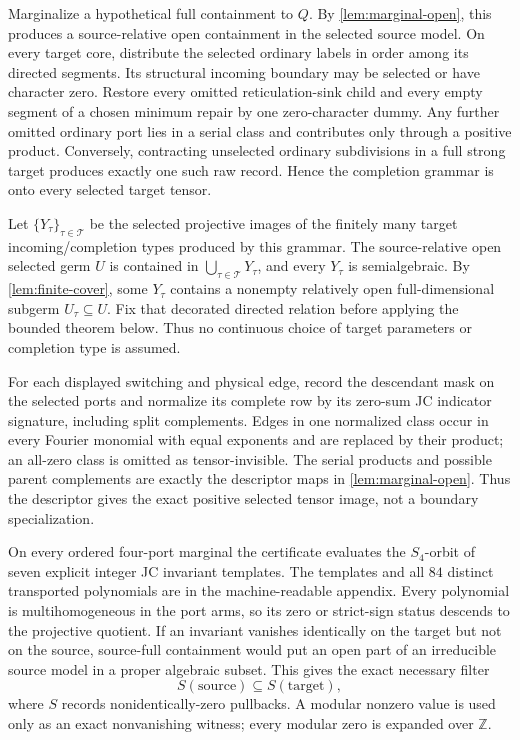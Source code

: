 \documentclass[11pt]{article}
\theoremstyle{remark}
\begin{document}
Marginalize a hypothetical full containment to $Q$.  By
\cref{lem:marginal-open}, this produces a source-relative open containment in
the selected source model.  On every target core,
distribute the selected ordinary labels in order among its directed
segments.  Its structural incoming boundary may be selected or have
character zero.  Restore every omitted reticulation-sink child and every
empty segment of a chosen minimum repair by one zero-character dummy.  Any
further omitted ordinary port lies in a serial class and contributes only
through a positive product.  Conversely, contracting unselected ordinary
subdivisions in a full strong target produces exactly one such raw record.
Hence the completion grammar is onto every selected target tensor.

Let $\{Y_\tau\}_{\tau\in\mathcal T}$ be the selected projective images of
the finitely many target incoming/completion types produced by this grammar.
The source-relative open selected germ $U$ is contained in
$\bigcup_{\tau\in\mathcal T}Y_\tau$, and every $Y_\tau$ is semialgebraic.
By \cref{lem:finite-cover}, some $Y_\tau$ contains a nonempty relatively open
full-dimensional subgerm $U_\tau\subseteq U$.  Fix that decorated directed
relation before applying the bounded theorem below.  Thus no continuous
choice of target parameters or completion type is assumed.

For each displayed switching and physical edge, record the descendant mask
on the selected ports and normalize its complete row by its zero-sum JC
indicator signature, including split complements.  Edges in one normalized
class occur in every Fourier monomial with equal exponents and are replaced
by their product; an all-zero class is omitted as tensor-invisible.  The
serial products and possible parent complements are exactly the descriptor
maps in \cref{lem:marginal-open}.  Thus the descriptor gives the exact
positive selected tensor image, not a boundary specialization.

On every ordered four-port marginal the certificate evaluates the
$S_4$-orbit of seven explicit integer JC invariant templates.  The templates
and all $84$ distinct transported polynomials are in the machine-readable
appendix.  Every polynomial is multihomogeneous in the port arms, so its zero
or strict-sign status descends to the projective quotient.  If an invariant
vanishes identically on the target but not on the source, source-full
containment would put an open part of an irreducible source model in a proper
algebraic subset.  This gives the exact necessary filter
\[
S(\text{source})\subseteq S(\text{target}),
\]
where $S$ records nonidentically-zero pullbacks.  A modular nonzero value is
used only as an exact nonvanishing witness; every modular zero is expanded
over $\mathbb Z$.
\end{document}

